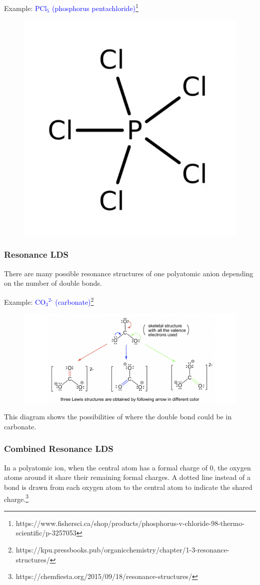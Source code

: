 \documentclass[a4paper, 12pt]{article}
\begin{document}
\noindent Example: \textcolor{blue}{PCl$_5$ (phosphorus pentachloride)}\footnote{https://www.fishersci.ca/shop/products/phosphorus-v-chloride-98-thermo-scientific/p-3257053}

\begin{figure}[H]
    \centering
    \includegraphics[width=0.2\linewidth]{exceptionlds.png}
    \label{fig:4}
\end{figure}



\subsubsection{Resonance LDS}
There are many possible resonance structures of one polyatomic anion depending on the number of double bonds.

Example: \textcolor{blue}{CO$_3$$^{\text{2-}}$ (carbonate)}\footnote{https://kpu.pressbooks.pub/organicchemistry/chapter/1-3-resonance-structures/}

\begin{figure}[H]
    \centering
    \includegraphics[width=0.8\linewidth]{resonancelds.png}
    \label{fig:200?!}
\end{figure}

\noindent This diagram shows the possibilities of where the double bond could be in carbonate.


\subsubsection{Combined Resonance LDS}
In a polyatomic ion, when the central atom has a formal charge of 0, the oxygen atoms around it share their remaining formal charges. A dotted line instead of a bond is drawn from each oxygen atom to the central atom to indicate the shared charge.\footnote{https://chemfiesta.org/2015/09/18/resonance-structures/}
\end{document}
